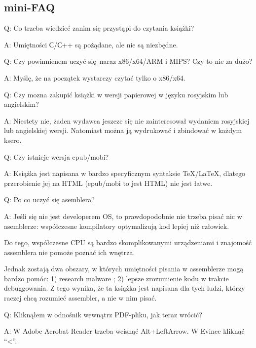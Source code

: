 \subsection*{mini-FAQ}


\par Q: Co trzeba wiedzieć zanim się przystąpi do czytania książki?
\par A: Umiętności С/С++ są pożądane, ale nie są niezbędne.

\par Q: Czy powinnienem uczyć się naraz x86/x64/ARM i MIPS? Czy to nie za dużo?
\par A: Myślę, że na początek wystarczy czytać tylko o x86/x64.

\par Q: Czy mozna zakupić książki w wersji papierowej w języku rosyjskim lub angielskim?
\par A: Niestety nie, żaden wydawca jeszcze się nie zainteresował wydaniem rosyjskiej lub angielskiej wersji. Natomiast można ją wydrukować i zbindować w każdym ksero.

\par Q: Czy istnieje wersja epub/mobi?
\par A: Książka jest napisana w bardzo specyficznym syntaksie TeX/LaTeX, dlatego przerobienie jej na HTML (epub/mobi to jest HTML)
nie jest łatwe.

\par Q: Po co uczyć się asemblera?
\par A: Jeśli się nie jest developerem \ac{OS}, to prawdopodobnie nie trzeba pisać nic w asemblerze: współczesne kompilatory optymalizują kod lepiej niż człowiek.

Do tego, współczesne \ac{CPU} są bardzo skomplikowanymi urządzeniami i znajomość assemblera nie pomoże poznać ich wnętrza.

Jednak zostają dwa obszary, w których umiętności pisania w assemblerze mogą bardzo pomóc:
1) research malware ; 2) lepsze zrozumienie kodu w trakcie debuggowania.
Z tego wynika, że ta książka jest napisana dla tych ludzi, którzy raczej chcą rozumieć assembler, a nie w nim pisać.

\par Q: Kliknąłem w odnośnik wewnątrz PDF-pliku, jak teraz wrócić?
\par A: W Adobe Acrobat Reader trzeba wcisnąć Alt+LeftArrow. W Evince kliknąć ``<''.

